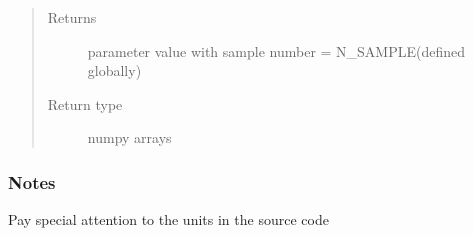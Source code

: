 \documentclass[letterpaper,10pt,english]{sphinxmanual}
\begin{document}
\begin{fulllineitems}
\begin{quote}
\begin{description}
\begin{itemize}
\end{itemize}

\item[{Returns}] \leavevmode
\sphinxAtStartPar
{} \textendash{} parameter value with sample number = N\_SAMPLE(defined globally)

\item[{Return type}] \leavevmode
\sphinxAtStartPar
numpy arrays

\end{description}\end{quote}
\subsubsection*{Notes}

\sphinxAtStartPar
Pay special attention to the units in the source code

\end{fulllineitems}

\end{document}
